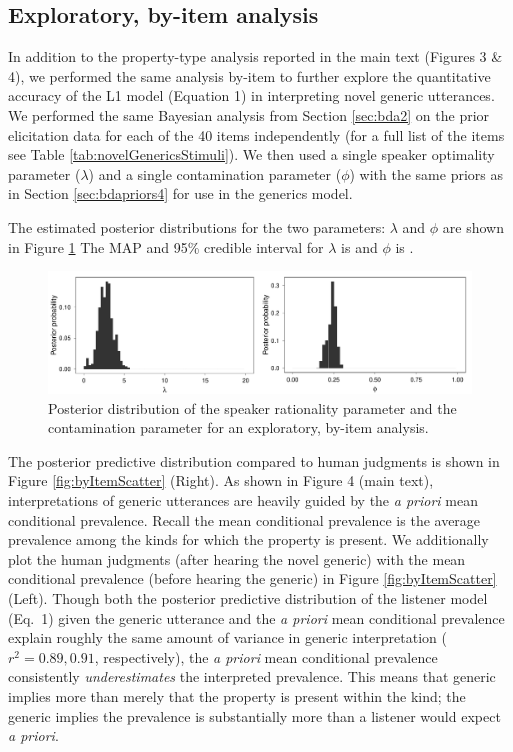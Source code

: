 \documentclass[10pt,letterpaper]{article}
\begin{document}
\subsection{Exploratory, by-item analysis}

In addition to the property-type analysis reported in the main text (Figures 3 \& 4), we performed the same analysis by-item to further explore the quantitative accuracy of the L1 model (Equation 1) in interpreting novel generic utterances. 
We performed the same Bayesian analysis from Section \ref{sec:bda2} on the prior elicitation data for each of the 40 items independently (for a full list of the items see Table \ref{tab:novelGenericsStimuli}). 
We then used a single speaker optimality parameter ($\lambda$) and a single contamination parameter ($\phi$) with the same priors as in Section \ref{sec:bdapriors4} for use in the generics model.

The estimated posterior distributions for the two parameters: $\lambda$ and $\phi$ are shown in Figure \ref{fig:byItemParameters}
The MAP and 95\% credible interval for $\lambda$ is and $\phi$ is .

\begin{figure}
\centering
    \includegraphics[width=0.8\columnwidth]{asymmetry-byItem-params-2x50k.pdf}
    \caption{Posterior distribution of the speaker rationality parameter and the contamination parameter for an exploratory, by-item analysis.}
  \label{fig:byItemParameters}
\end{figure}



The posterior predictive distribution compared to human judgments is shown in Figure \ref{fig:byItemScatter} (Right). 
As shown in Figure 4 (main text), interpretations of generic utterances are heavily guided by the \emph{a priori} mean conditional prevalence. 
Recall the mean conditional prevalence is the average prevalence among the kinds for which the property is present. 
We additionally plot the human judgments (after hearing the novel generic) with the mean conditional prevalence (before hearing the generic) in Figure \ref{fig:byItemScatter} (Left). 
Though both the posterior predictive distribution of the listener model (Eq.~1) given the generic utterance and the \emph{a priori} mean conditional prevalence explain roughly the same amount of variance in generic interpretation ($r^2 = 0.89, 0.91$, respectively), the \emph{a priori} mean conditional prevalence consistently \emph{underestimates} the interpreted prevalence.
This means that generic implies more than merely that the property is present within the kind; the generic implies the prevalence is substantially more than a listener would expect \emph{a priori}. 
\end{document}

